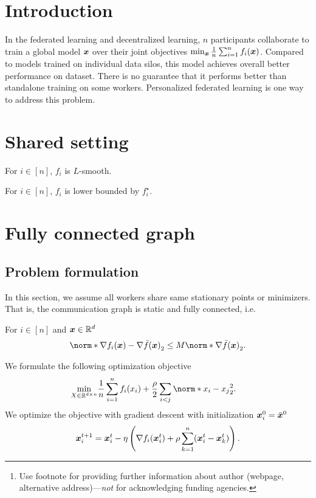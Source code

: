 \documentclass{article}
\title{}
\author{%
  David S.~Hippocampus\thanks{Use footnote for providing further information
    about author (webpage, alternative address)---\emph{not} for acknowledging
    funding agencies.} \\
  Department of Computer Science\\
  Cranberry-Lemon University\\
  Pittsburgh, PA 15213 \\
  \texttt{hippo@cs.cranberry-lemon.edu} \\
}
\begin{document}
\maketitle

%    
\section{Introduction}

In the federated learning and decentralized learning, $n$ participants collaborate to train a global model $\bm{x}$ over their joint objectives $\min_{\bm{x}} \frac{1}{n}\sum_{i=1}^n f_i(\bm{x})$.
Compared to models trained on individual data silos, this model achieves overall better performance on dataset. 
There is no guarantee that it performs better than standalone training on some workers. 
Personalized federated learning is one way to address this problem. 
% 

\section{Shared setting}
\begin{assumption}[$L$-smoothness]\label{a:smooth}
  For $i\in[n]$, $f_i$ is $L$-smooth.
\end{assumption}
\begin{assumption}\label{a:lower-bound}
  For $i\in[n]$, $f_i$ is lower bounded by $f_i^\star$.
\end{assumption}

\section{Fully connected graph}
\subsection{Problem formulation}
In this section, we assume all workers share same stationary points or minimizers. That is, the communication graph is static and fully connected, i.e.
\begin{assumption}\label{a:strong-growth}
  For $i\in[n]$ and $\bm{x}\in\mathbb{R}^d$
  \begin{align*}
    \norm*{\nabla f_i(\xx) - \nabla \bar{f}(\xx)}_2 \le M \norm*{\nabla \bar{f}(\xx)}_2.
  \end{align*}
\end{assumption}
We formulate the following optimization objective
\begin{align*}
  \min_{X\in\mathbb{R}^{d\times n}}&  \frac{1}{n} \sum_{i=1}^n f_i(x_i) + \frac{\rho}{2} \sum_{i<j} \norm*{x_{i} - x_{j}}_2^2.
\end{align*}
We optimize the objective with gradient descent with initialization $\bm{x}_i^0=\bar{\bm{x}}^0$
\begin{equation}\label{eq:x:gd:1}
    \bm{x}_i^{t+1}=\bm{x}_i^t - \eta \left(
      \nabla f_i(\bm{x}^t_i) + \rho \sum_{k=1}^n (\bm{x}^t_i - \bm{x}^t_k)
    \right).
\end{equation}
\end{document}
